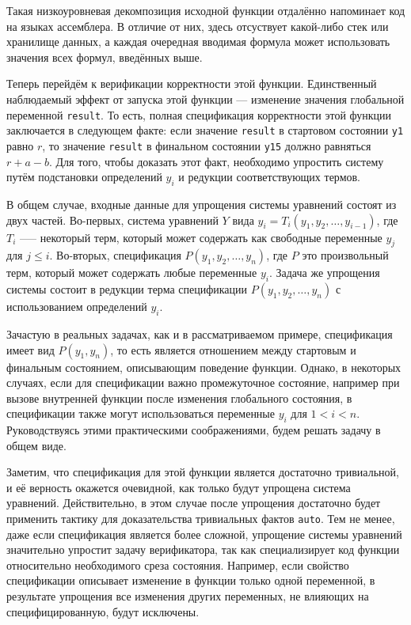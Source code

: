 \documentclass[../diploma.tex]{subfiles}
\begin{document}
Такая низкоуровневая декомпозиция исходной функции отдалённо напоминает код на языках ассемблера. В отличие от них, здесь отсуствует какой-либо стек или хранилище данных, а каждая очередная вводимая формула может использовать значения всех формул, введённых выше.

Теперь перейдём к верификации корректности этой функции. Единственный наблюдаемый эффект от запуска этой функции --- изменение значения глобальной переменной \texttt{result}. То есть, полная спецификация корректности этой функции заключается в следующем факте: если значение \texttt{result} в стартовом состоянии \texttt{y1} равно $r$, то значение \texttt{result} в финальном состоянии \texttt{y15} должно равняться $r + a - b$. Для того, чтобы доказать этот факт, необходимо упростить систему путём подстановки определений $y_i$ и редукции соответствующих термов.

В общем случае, входные данные для упрощения системы уравнений состоят из двух частей. Во-первых, система уравнений $Y$ вида $y_i = T_i(y_1, y_2, \dots, y_{i - 1})$, где $T_i$ —-- некоторый терм, который может содержать как свободные переменные $y_j$ для $j \le i$. Во-вторых, спецификация $P(y_1, y_2, \dots, y_n)$, где $P$ это произвольный терм, который может содержать любые переменные $y_i$. Задача же упрощения системы состоит в редукции терма спецификации $P(y_1, y_2, \dots, y_n)$ с использованием определений $y_i$.

Зачастую в реальных задачах, как и в рассматриваемом примере, спецификация имеет вид $P(y_1, y_n)$, то есть является отношением между стартовым и финальным состоянием, описывающим поведение функции. Однако, в некоторых случаях, если для спецификации важно промежуточное состояние, например при вызове внутренней функции после изменения глобального состояния, в спецификации также могут использоваться переменные $y_i$ для $1 < i < n$. Руководствуясь этими практическими соображениями, будем решать задачу в общем виде.

Заметим, что спецификация для этой функции является достаточно тривиальной, и её верность окажется очевидной, как только будут упрощена система уравнений. Действительно, в этом случае после упрощения достаточно будет применить тактику для доказательства тривиальных фактов \texttt{auto}. Тем не менее, даже если спецификация является более сложной, упрощение системы уравнений значительно упростит задачу верификатора, так как специализирует код функции относительно необходимого среза состояния. Например, если свойство спецификации описывает изменение в функции только одной переменной, в результате упрощения все изменения других переменных, не влияющих на специфицированную, будут исключены.
\end{document}
